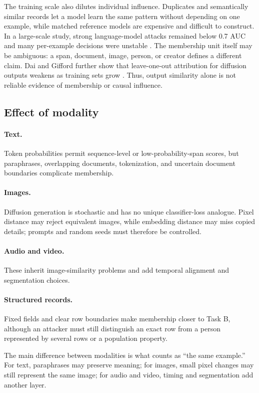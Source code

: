 \documentclass[11pt]{article}
\begin{document}
The training scale also dilutes individual influence. Duplicates and semantically similar
records let a model learn the same pattern without depending on one example, while matched
reference models are expensive and difficult to construct. In a large-scale study, strong
language-model attacks remained below 0.7 AUC and many per-example decisions were unstable
\cite{hayes2025}. The membership unit itself may be ambiguous: a span, document, image,
person, or creator defines a different claim. Dai and Gifford further show that
leave-one-out attribution for diffusion outputs weakens as training sets grow
\cite{dai2026}. Thus, output similarity alone is not reliable evidence of membership or
causal influence.

\subsection{Effect of modality}

\paragraph{Text.} Token probabilities permit sequence-level or low-probability-span
scores, but paraphrases, overlapping documents, tokenization, and uncertain document
boundaries complicate membership.

\paragraph{Images.} Diffusion generation is stochastic and has no unique classifier-loss
analogue. Pixel distance may reject equivalent images, while embedding distance may miss
copied details; prompts and random seeds must therefore be controlled.

\paragraph{Audio and video.} These inherit image-similarity problems and add temporal
alignment and segmentation choices.

\paragraph{Structured records.} Fixed fields and clear row boundaries make membership
closer to Task B, although an attacker must still distinguish an exact row from a person
represented by several rows or a population property.

The main difference between modalities is what counts as ``the same example.'' For text,
paraphrases may preserve meaning; for images, small pixel changes may still represent the
same image; for audio and video, timing and segmentation add another layer.
\end{document}
